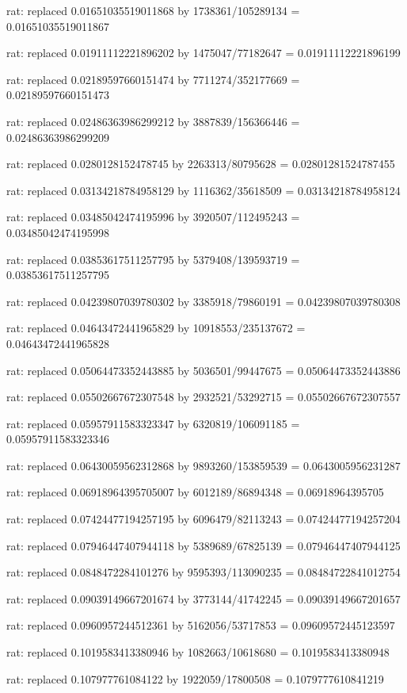 \documentclass[a4paper,10pt]{article}
\begin{document}
\begin{eulernotebook}
\begin{eulercomment}
\begin{eulercomment}
\begin{eulercomment}
\begin{eulercomment}
\begin{eulercomment}
\begin{eulercomment}
\begin{eulercomment}
\begin{eulercomment}
\begin{eulercomment}
\begin{eulercomment}
\begin{eulercomment}
\begin{eulercomment}
\begin{eulercomment}
\begin{eulercomment}
\begin{eulercomment}
\begin{eulercomment}
\begin{euleroutput}
  rat: replaced 0.01651035519011868 by 1738361/105289134 = 0.01651035519011867
  
  rat: replaced 0.01911112221896202 by 1475047/77182647 = 0.01911112221896199
  
  rat: replaced 0.02189597660151474 by 7711274/352177669 = 0.02189597660151473
  
  rat: replaced 0.02486363986299212 by 3887839/156366446 = 0.02486363986299209
  
  rat: replaced 0.0280128152478745 by 2263313/80795628 = 0.02801281524787455
  
  rat: replaced 0.03134218784958129 by 1116362/35618509 = 0.03134218784958124
  
  rat: replaced 0.03485042474195996 by 3920507/112495243 = 0.03485042474195998
  
  rat: replaced 0.03853617511257795 by 5379408/139593719 = 0.03853617511257795
  
  rat: replaced 0.04239807039780302 by 3385918/79860191 = 0.04239807039780308
  
  rat: replaced 0.04643472441965829 by 10918553/235137672 = 0.04643472441965828
  
  rat: replaced 0.05064473352443885 by 5036501/99447675 = 0.05064473352443886
  
  rat: replaced 0.05502667672307548 by 2932521/53292715 = 0.05502667672307557
  
  rat: replaced 0.05957911583323347 by 6320819/106091185 = 0.05957911583323346
  
  rat: replaced 0.06430059562312868 by 9893260/153859539 = 0.0643005956231287
  
  rat: replaced 0.06918964395705007 by 6012189/86894348 = 0.06918964395705
  
  rat: replaced 0.07424477194257195 by 6096479/82113243 = 0.07424477194257204
  
  rat: replaced 0.07946447407944118 by 5389689/67825139 = 0.07946447407944125
  
  rat: replaced 0.0848472284101276 by 9595393/113090235 = 0.08484722841012754
  
  rat: replaced 0.09039149667201674 by 3773144/41742245 = 0.09039149667201657
  
  rat: replaced 0.0960957244512361 by 5162056/53717853 = 0.09609572445123597
  
  rat: replaced 0.1019583413380946 by 1082663/10618680 = 0.1019583413380948
  
  rat: replaced 0.107977761084122 by 1922059/17800508 = 0.1079777610841219
  

\end{euleroutput}
\end{eulercomment}
\end{eulercomment}
\end{eulercomment}
\end{eulercomment}
\end{eulercomment}
\end{eulercomment}
\end{eulercomment}
\end{eulercomment}
\end{eulercomment}
\end{eulercomment}
\end{eulercomment}
\end{eulercomment}
\end{eulercomment}
\end{eulercomment}
\end{eulercomment}
\end{eulercomment}
\end{eulernotebook}
\end{document}
